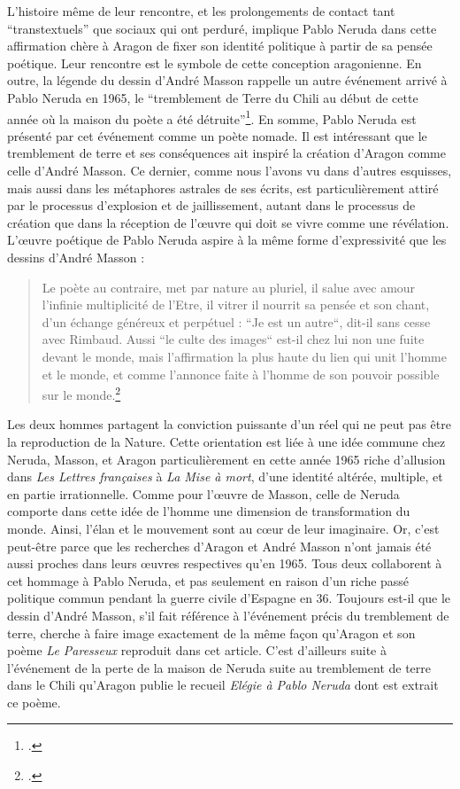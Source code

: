 L’histoire même de leur rencontre, et les prolongements de contact tant \enquote{transtextuels} que sociaux qui ont perduré, implique Pablo Neruda dans cette affirmation chère à Aragon de fixer son identité politique à partir de sa pensée poétique. Leur rencontre est le symbole de cette conception aragonienne. En outre, la légende du dessin d’André Masson rappelle un autre événement arrivé à Pablo Neruda en 1965, le \enquote{tremblement de Terre du Chili au début de cette année où la maison du poète a été détruite}\footcite{pabloneruda}. En somme, Pablo Neruda est présenté par cet événement comme un poète nomade. Il est intéressant que le tremblement de terre et ses conséquences ait inspiré la création d’Aragon comme celle d’André Masson. Ce dernier, comme nous l’avons vu dans d’autres esquisses, mais aussi dans les métaphores astrales de ses écrits, est particulièrement attiré par le processus d’explosion et de jaillissement, autant dans le processus de création que dans la réception de l’\oe{}uvre qui doit se vivre comme une révélation. L’\oe{}uvre poétique de Pablo Neruda aspire à la même forme d’expressivité que les dessins d’André Masson :

\begin{quote}
Le poète au contraire, met par nature au pluriel, il salue avec amour l’infinie multiplicité de l’Etre, il vitrer il nourrit sa pensée et son chant, d’un échange généreux et perpétuel : “Je est un autre“, dit-il sans cesse avec Rimbaud. Aussi “le culte des images“ est-il chez lui non une fuite devant le monde, mais l’affirmation la plus haute du lien qui unit l’homme et le monde, et comme l’annonce faite à l’homme de son pouvoir possible sur le monde.\footcite{marcenac2004pablo}\end{quote}	


	Les deux hommes partagent la conviction puissante d’un réel qui ne peut pas être la reproduction de la Nature. Cette orientation est liée à une idée commune chez Neruda, Masson, et Aragon particulièrement en cette année 1965 riche d’allusion dans \emph{Les Lettres françaises} à \emph{La Mise à mort}, d’une identité altérée, multiple, et en partie irrationnelle. Comme pour l’\oe{}uvre de Masson, celle de Neruda comporte dans cette idée de l’homme une dimension de transformation du monde. Ainsi, l’élan et le mouvement sont au c\oe{}ur de leur imaginaire. Or, c’est peut-être parce que les recherches d’Aragon et André Masson n’ont jamais été aussi proches dans leurs \oe{}uvres respectives qu’en 1965. Tous deux collaborent à cet hommage à Pablo Neruda, et pas seulement en raison d'un riche passé politique commun pendant la guerre civile d’Espagne en 36.  Toujours est-il que le dessin d’André Masson, s’il fait référence à l’événement précis du tremblement de terre, cherche à faire image exactement de la même façon qu’Aragon et son poème \emph{Le Paresseux} reproduit dans cet article. C’est d’ailleurs suite à l’événement de la perte de la maison de Neruda suite au tremblement de terre dans le Chili qu’Aragon publie le recueil \emph{Elégie à Pablo Neruda} dont est extrait ce poème. 

